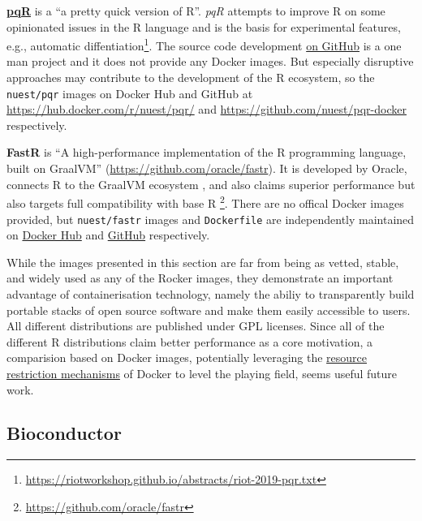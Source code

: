\textbf{\href{http://www.pqr-project.org/}{pqR}} is a ``a pretty quick
version of R''. \emph{pqR} attempts to improve R on some opinionated
issues in the R language and is the basis for experimental features,
e.g., automatic
diffentiation\footnote{\href{https://riotworkshop.github.io/abstracts/riot-2019-pqr.txt}{https://riotworkshop.github.io/abstracts/riot-2019-pqr.txt}}.
The source code development
\href{https://github.com/radfordneal/pqR/}{on GitHub} is a one man
project and it does not provide any Docker images. But especially
disruptive approaches may contribute to the development of the R
ecosystem, so the \texttt{nuest/pqr} images on Docker Hub and GitHub at
\url{https://hub.docker.com/r/nuest/pqr/} and
\url{https://github.com/nuest/pqr-docker} respectively.

\textbf{FastR} is ``A high-performance implementation of the R
programming language, built on GraalVM''
(\url{https://github.com/oracle/fastr}). It is developed by Oracle,
connects R to the GraalVM ecosystem \citep{wikipedia_graalvm_2019}, and
also claims superior performance but also targets full compatibility
with base R
\footnote{\href{https://github.com/oracle/fastr}{https://github.com/oracle/fastr}}.
There are no offical Docker images provided, but \texttt{nuest/fastr}
images and \texttt{Dockerfile} are independently maintained on
\href{https://cloud.docker.com/repository/docker/nuest/fastr/}{Docker
Hub} and \href{https://github.com/nuest/fastr-docker}{GitHub}
respectively.

While the images presented in this section are far from being as vetted,
stable, and widely used as any of the Rocker images, they demonstrate an
important advantage of containerisation technology, namely the abiliy to
transparently build portable stacks of open source software and make
them easily accessible to users. All different distributions are
published under GPL licenses. Since all of the different R distributions
claim better performance as a core motivation, a comparision based on
Docker images, potentially leveraging the
\href{https://docs.docker.com/config/containers/resource_constraints/}{resource
restriction mechanisms} of Docker to level the playing field, seems
useful future work.

\hypertarget{bioconductor}{%
\subsection{Bioconductor}\label{bioconductor}}

